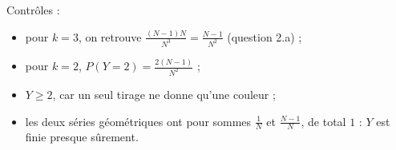 \documentclass[11pt,a4paper]{article}
\providecommand{\tightlist}{\setlength{\itemsep}{0pt}\setlength{\parskip}{0pt}}
\begin{document}
Contrôles :

\begin{itemize}
\tightlist
\item
  pour \(k=3\), on retrouve \(\frac{(N-1)N}{N^3}=\frac{N-1}{N^2}\) (question 2.a) ;
\item
  pour \(k=2\), \(P(Y=2)=\frac{2(N-1)}{N^2}\) ;
\item
  \(Y\ge2\), car un seul tirage ne donne qu'une couleur ;
\item
  les deux séries géométriques ont pour sommes \(\frac1N\) et \(\frac{N-1}N\), de total \(1\) : \(Y\) est finie presque sûrement.
\end{itemize}
\end{document}
